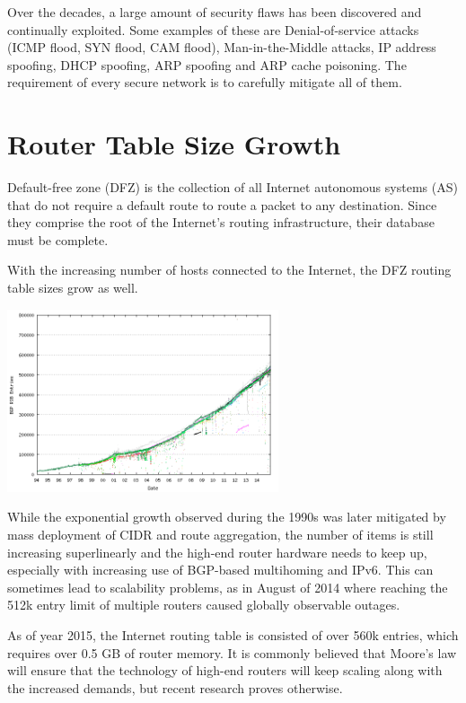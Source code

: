         Over the decades, a large amount of security flaws has been discovered and continually exploited. Some examples of these are Denial-of-service attacks (ICMP flood, SYN flood, CAM flood), Man-in-the-Middle attacks, IP address spoofing, DHCP spoofing, ARP spoofing and ARP cache poisoning. The requirement of every secure network is to carefully mitigate all of them.

    \section{Router Table Size Growth}
        Default-free zone (DFZ) is the collection of all Internet autonomous systems (AS) that do not require a default route to route a packet to any destination. Since they comprise the root of the Internet's routing infrastructure, their database must be complete.

        With the increasing number of hosts connected to the Internet, the DFZ routing table sizes grow as well.

        \begin{center}\includegraphics[width=0.6\textwidth]{media/bgp-active.png}\end{center}

        While the exponential growth observed during the 1990s was later mitigated by mass deployment of CIDR and route aggregation, the number of items is still increasing superlinearly and the high-end router hardware needs to keep up, especially with increasing use of BGP-based multihoming and IPv6. This can sometimes lead to scalability problems, as in August of 2014 where reaching the 512k entry limit of multiple routers caused globally observable outages.

        As of year 2015, the Internet routing table is consisted of over 560k entries, which requires over 0.5 GB of router memory. It is commonly believed that Moore's law will ensure that the technology of high-end routers will keep scaling along with the increased demands, but recent research proves otherwise.

